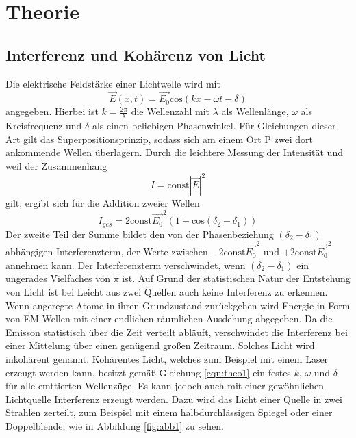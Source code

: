 \section{Theorie}
\label{sec:Theorie}

\subsection{Interferenz und Kohärenz von Licht}
\label{sec:theo1}

Die elektrische Feldstärke einer Lichtwelle wird mit
\begin{equation}
    \vec{E}(x,t) = \vec{E_0}\text{cos}(kx - \omega t - \delta)
    \label{eqn:theo1}
\end{equation}
angegeben.
Hierbei ist $k = \frac{2 \pi}{\lambda}$ die Wellenzahl mit $\lambda$ als Wellenlänge, $\omega$ als Kreisfrequenz und $\delta$ als einen beliebigen Phasenwinkel.
Für Gleichungen dieser Art gilt das Superpositionsprinzip, sodass sich am einem Ort P zwei dort ankommende Wellen überlagern.
Durch die leichtere Messung der Intensität und weil der Zusammenhang
\begin{equation}
    I = \text{const} |\vec{E}|^2
\end{equation}
gilt, ergibt sich für die Addition zweier Wellen
\begin{equation}
    I_{ges} = 2\text{const} \vec{E_0}^2(1+\text{cos}(\delta_2-\delta_1))
\end{equation}
Der zweite Teil der Summe bildet den von der Phasenbeziehung $(\delta_2-\delta_1)$ abhängigen Interferenzterm, der Werte zwischen $-2\text{const} \vec{E_0}^2$ und $+2\text{const} \vec{E_0}^2$ annehmen kann.
Der Interferenzterm verschwindet, wenn $(\delta_2-\delta_1)$ ein ungerades Vielfaches von $\pi$ ist.
Auf Grund der statistischen Natur der Entstehung von Licht ist bei Leicht aus zwei Quellen auch keine Interferenz zu erkennen.
Wenn angeregte Atome in ihren Grundzustand zurückgehen wird Energie in Form von EM-Wellen mit einer endlichen räumlichen Ausdehung abgegeben.
Da die Emisson statistisch über die Zeit verteilt abläuft, verschwindet die Interferenz bei einer Mittelung über einen genügend großen Zeitraum.
Solches Licht wird inkohärent genannt.
Kohärentes Licht, welches zum Beispiel mit einem Laser erzeugt werden kann, besitzt gemäß Gleichung \eqref{eqn:theo1} ein festes $k$, $\omega$ und $\delta$ für alle emttierten Wellenzüge.
Es kann jedoch auch mit einer gewöhnlichen Lichtquelle Interferenz erzeugt werden.
Dazu wird das Licht einer Quelle in zwei Strahlen zerteilt, zum Beispiel mit einem halbdurchlässigen Spiegel oder einer Doppelblende, wie in Abbildung \ref{fig:abb1} zu sehen.
